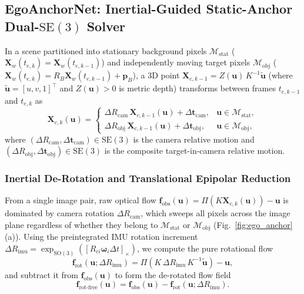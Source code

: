 \documentclass[journal]{IEEEtran}
\begin{document}
\subsection{EgoAnchorNet: Inertial-Guided Static-Anchor Dual-$\mathrm{SE}(3)$ Solver}
In a scene partitioned into stationary background pixels $\mathcal{M}_{\text{stat}}$ ($\mathbf{X}_w(t_{e,k}) = \mathbf{X}_w(t_{e,k-1})$) and independently moving target pixels $\mathcal{M}_{\text{obj}}$ ($\mathbf{X}_w(t_{e,k}) = R_{B}\mathbf{X}_w(t_{e,k-1}) + \mathbf{p}_B$), a 3D point $\mathbf{X}_{c,k-1} = Z(\mathbf{u})\,K^{-1}\tilde{\mathbf{u}}$ (where $\tilde{\mathbf{u}} = [u, v, 1]^\top$ and $Z(\mathbf{u}) > 0$ is metric depth) transforms between frames $t_{e,k-1}$ and $t_{e,k}$ as
\begin{equation}
\mathbf{X}_{c,k}(\mathbf{u}) = \begin{cases}
\Delta R_{\text{cam}}\,\mathbf{X}_{c,k-1}(\mathbf{u}) + \Delta\mathbf{t}_{\text{cam}}, & \mathbf{u} \in \mathcal{M}_{\text{stat}}, \\[4pt]
\Delta R_{\text{obj}}\,\mathbf{X}_{c,k-1}(\mathbf{u}) + \Delta\mathbf{t}_{\text{obj}}, & \mathbf{u} \in \mathcal{M}_{\text{obj}},
\end{cases}
\label{eq:3d_motion_piecewise}
\end{equation}
where $(\Delta R_{\text{cam}}, \Delta\mathbf{t}_{\text{cam}}) \in \mathrm{SE}(3)$ is the camera relative motion and $(\Delta R_{\text{obj}}, \Delta\mathbf{t}_{\text{obj}}) \in \mathrm{SE}(3)$ is the composite target-in-camera relative motion.

\subsubsection{Inertial De-Rotation and Translational Epipolar Reduction}
From a single image pair, raw optical flow $\mathbf{f}_{\text{obs}}(\mathbf{u}) = \Pi(K\mathbf{X}_{c,k}(\mathbf{u})) - \mathbf{u}$ is dominated by camera rotation $\Delta R_{\text{cam}}$, which sweeps all pixels across the image plane regardless of whether they belong to $\mathcal{M}_{\text{stat}}$ or $\mathcal{M}_{\text{obj}}$ (Fig.~\ref{fig:ego_anchor}(a)). Using the preintegrated IMU rotation increment $\Delta R_{\text{imu}} = \exp_{\mathrm{SO}(3)}([R_{ci}\boldsymbol{\omega}_{i}\Delta t]_\times)$, we compute the pure rotational flow
\begin{equation}
\mathbf{f}_{\text{rot}}(\mathbf{u}; \Delta R_{\text{imu}}) = \Pi\!\left(K\,\Delta R_{\text{imu}}\,K^{-1}\tilde{\mathbf{u}}\right) - \mathbf{u},
\label{eq:f_rot}
\end{equation}
and subtract it from $\mathbf{f}_{\text{obs}}(\mathbf{u})$ to form the de-rotated flow field
\begin{equation}
\mathbf{f}_{\text{rot-free}}(\mathbf{u}) = \mathbf{f}_{\text{obs}}(\mathbf{u}) - \mathbf{f}_{\text{rot}}(\mathbf{u}; \Delta R_{\text{imu}}).
\label{eq:rot_free}
\end{equation}
\end{document}
